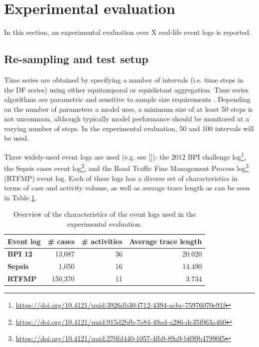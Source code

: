 \section{Experimental evaluation}\label{sec:experiment}
In this section, an experimental evaluation over X real-life event logs is reported.


\subsection{Re-sampling and test setup}
Time series are obtained by specifying a number of intervals (i.e. time steps in the DF series) using either equitemporal or equidistant aggregation.
Time series algorithms are parametric and sensitive to sample size requirements \cite{hanke2001business}.
Depending on the number of parameters a model uses, a minimum size of at least 50 steps is not uncommon, although typically model performance should be monitored at a varying number of steps.
In the experimental evaluation, 50 and 100 intervals will be used.

Three widely-used event logs are used (e.g. see []): the 2012 BPI challenge log\footnote{\url{https://doi.org/10.4121/uuid:3926db30-f712-4394-aebc-75976070e91f}}, the Sepsis cases event log\footnote{\url{https://doi.org/10.4121/uuid:915d2bfb-7e84-49ad-a286-dc35f063a460}}, and the Road Traffic Fine Management Process log\footnote{\url{https://doi.org/10.4121/uuid:270fd440-1057-4fb9-89a9-b699b47990f5}} (RTFMP) event log.
Each of these logs has a diverse set of characteristics in terms of case and activity volume, as well as average trace length as can be seen in Table \ref{tab:eventlogs}.
\begin{table}[htbp]
  \centering
    \begin{tabular}{lrrr}
    \toprule
    \textbf{Event log} & \multicolumn{1}{l}{\textbf{\# cases}} & \multicolumn{1}{l}{\textbf{\# activities}} & \multicolumn{1}{l}{\textbf{Average trace length}} \\
    \midrule
    \textbf{BPI 12} & 13,087 & 36    & 20.020 \\
    \textbf{Sepsis} & 1,050 & 16    & 14.490 \\
    \textbf{RTFMP} & 150,370 & 11    & 3.734 \\
    \bottomrule
    \end{tabular}%
  \caption{Overview of the characteristics of the event logs used in the experimental evaluation.}
  \label{tab:eventlogs}%
\end{table}%

